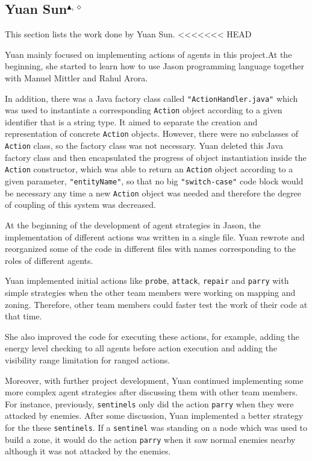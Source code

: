 \subsection[Yuan Sun]{Yuan Sun$^{\blacktriangle,\diamond}$}
This section lists the work done by Yuan Sun.
<<<<<<< HEAD

Yuan mainly focused on implementing actions of agents in this project.At the beginning, she started to learn how to use Jason programming language together with Manuel Mittler and Rahul Arora.

In addition, there was a Java factory class called \texttt{"ActionHandler.java"} which was used to instantiate a corresponding \texttt{Action} object according to a given identifier that is a string type. It aimed to separate the creation and representation of concrete \texttt{Action} objects. However, there were no subclasses of \texttt{Action} class, so the factory class was not necessary. Yuan deleted this Java factory class and then encapsulated the progress of object instantiation inside the \texttt{Action} constructor, which was able to return an \texttt{Action} object according to a given parameter, \texttt{"entityName"}, so that no big \texttt{"switch-case"} code block would be necessary any time a new \texttt{Action} object was needed and therefore the degree of coupling of this system was decreased. 

At the beginning of the development of agent strategies in Jason, the implementation of different actions was written in a single file. 
Yuan rewrote and reorganized some of the code in different files with names corresponding to the roles of different agents. 

Yuan implemented initial actions like \texttt{probe}, \texttt{attack}, \texttt{repair} and \texttt{parry} with simple strategies when the other team members were working on mapping and zoning. 
Therefore, other team members could faster test the work of their code at that time. 

She also improved the code for executing these actions, for example, adding the energy level checking to all agents before action execution and adding the visibility range limitation for ranged actions. 

Moreover, with further project development, Yuan continued implementing some more complex agent strategies after discussing them with other team members. For instance, previously, \texttt{sentinels} only did the action \texttt{parry} when they were attacked by enemies. After some discussion, Yuan implemented a better strategy for the these \texttt{sentinels}. If a \texttt{sentinel} was standing on a node which was used to build a zone, it would do the action \texttt{parry} when it saw normal enemies nearby although it was not attacked by the enemies.

